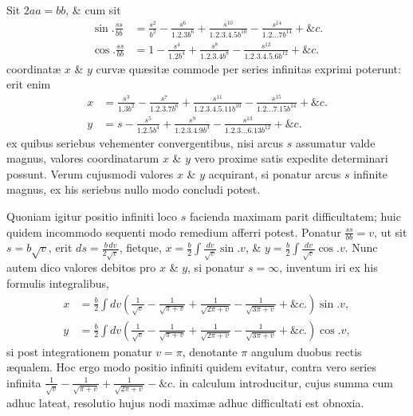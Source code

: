 Sit $2aa=bb$, \& cum sit
\[\begin{aligned}
\sin.\frac{ss}{bb}&=\frac{s^2}{b^2}-\frac{s^6}{1.2.3b^6}+\frac{s^{10}}{1.2.3.4.5b^{10}}-\frac{s^{14}}{1.2\ldots7b^{14}}+\&c.\\
\cos.\frac{ss}{bb}&=1-\frac{s^4}{1.2b^4}+\frac{s^8}{1.2.3.4b^8}-\frac{s^{12}}{1.2.3.4.5.6b^{12}}+\&c.
\end{aligned}\]
coordinatæ $x$ \& $y$ curvæ quæsitæ commode per series infinitas exprimi poterunt: erit enim
\[\begin{aligned}
x&=\frac{s^3}{1.3b^2}-\frac{s^7}{1.2.3.7b^6}+\frac{s^{11}}{1.2.3.4.5.11b^{10}}-\frac{s^{15}}{1.2\ldots7.15b^{14}}+\&c.\\
y&=s-\frac{s^5}{1.2.5b^4}+\frac{s^9}{1.2.3.4.9b^3}-\frac{s^{13}}{1.2.3\ldots6.13b^{12}}+\&c.
\end{aligned}\]
ex quibus seriebus vehementer convergentibus, nisi arcus $s$ assumatur valde magnus, valores coordinatarum $x$ \& $y$ vero proxime satis expedite determinari possunt. Verum cujusmodi valores $x$ \& $y$ acquirant, si ponatur arcus $s$ infinite magnus, ex his seriebus nullo modo concludi potest.

Quoniam igitur positio infiniti loco $s$ facienda maximam parit difficultatem; huic quidem incommodo sequenti modo remedium afferri potest. Ponatur $\frac{ss}{bb}=v$, ut sit $s=b\sqrt v$, erit $ds=\frac{b\,dv}{2\sqrt v}$, fietque, $x=\frac b2\int\frac{dv}{\sqrt v}\sin.v$, \& $y=\frac b2\int\frac{dv}{\sqrt v}\cos.v$. Nunc autem dico valores debitos pro $x$ \& $y$, si ponatur $s=\infty$, inventum iri ex his formulis integralibus,
\[\begin{aligned}
x&=\frac b2\int dv\left(\frac1{\sqrt v}-\frac1{\sqrt{\pi+v}}+\frac1{\sqrt{2\pi+v}}-\frac1{\sqrt{3\pi+v}}+\&c.\right)\sin.v,\\
y&=\frac b2\int dv\left(\frac1{\sqrt v}-\frac1{\sqrt{\pi+v}}+\frac1{\sqrt{2\pi+v}}-\frac1{\sqrt{3\pi+v}}+\&c.\right)\cos.v,
\end{aligned}\]
si post integrationem ponatur $v=\pi$, denotante $\pi$ angulum duobus rectis æqualem. Hoc ergo modo positio infiniti quidem evitatur, contra vero series infinita $\frac1{\sqrt v}-\frac1{\sqrt{\pi+v}}+\frac1{\sqrt{2\pi+v}}-\&c.$ in calculum introducitur, cujus summa cum adhuc lateat, resolutio hujus nodi maximæ adhuc difficultati est obnoxia.

